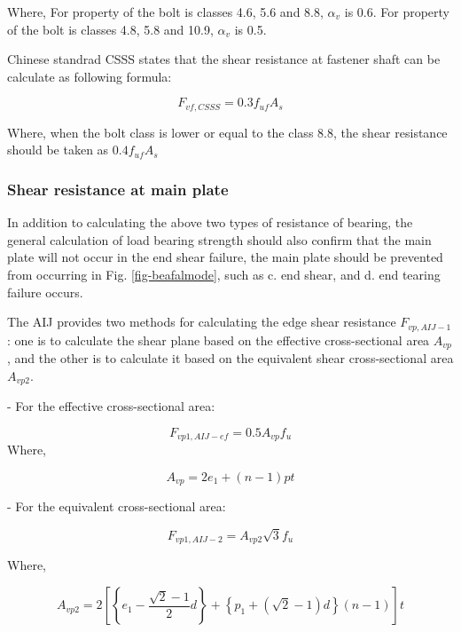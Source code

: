 Where, For property of the bolt is classes 4.6, 5.6 and 8.8, $\alpha_v$ is 0.6. For property of the bolt is classes 4.8, 5.8 and 10.9, $\alpha_v$ is 0.5.

Chinese standrad \cite{gb50017-2017} \ac{CSSS} states that the  shear resistance at fastener shaft can be calculate as following formula:

\begin{equation}
    F_{vf,CSSS} = 0.3 f_{uf}A_s
\end{equation}

Where, when the bolt class is lower or equal to the class 8.8, the shear resistance should be taken as $0.4f_{uf}A_s$


\subsubsection{Shear resistance at main plate}

In addition to calculating the above two types of resistance of bearing, the general calculation of load bearing strength should also confirm that the main plate will not occur in the end shear failure, the main plate should be prevented from occurring in Fig. \ref{fig-beafalmode}, such as c. end shear, and d. end tearing failure occurs.

The \ac{AIJ} \cite{AIJ2012AIJStructures} provides two methods for calculating the edge shear resistance $F_{vp,AIJ-1}$ : one is to calculate the shear plane based on the effective cross-sectional area $A_{vp}$, and the other is to calculate it based on the equivalent shear cross-sectional area $A_{vp2}$.

- For the effective cross-sectional area:

\begin{equation}
    F_{vp1,AIJ-ef} = 0.5 A_{vp}f_u
\end{equation}
Where, 

\begin{equation}
    A_{vp} = 2 {e_1 + (n-1)p}t
\end{equation}

- For the equivalent cross-sectional area:

\begin{equation}
    F_{vp1,AIJ-2} = A_{vp2}\sqrt{3}f_u
\end{equation}

Where,

\begin{equation}
A_{vp2}=2\left[\left\{e_1-\frac{\sqrt{2}-1}{2} d\right\}+\left\{p_1+(\sqrt{2}-1) d\right\}(n-1)\right] t
\end{equation}

